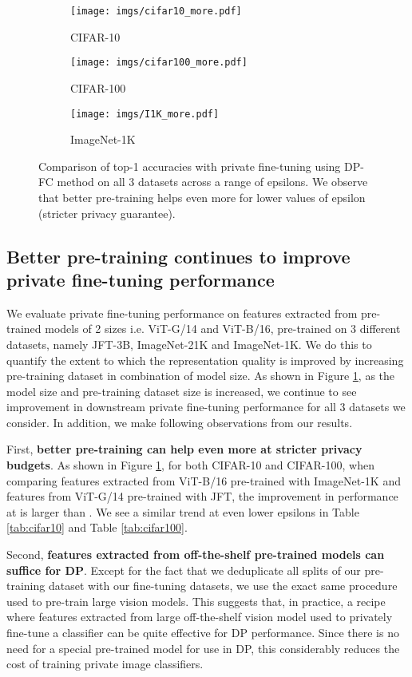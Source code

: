 \documentclass[letterpaper]{article} \usepackage{fullpage}
\begin{document}
\begin{figure}[h!]
  \centering
      \begin{subfigure}[b]{0.32\textwidth}
    \texttt{[image: imgs/cifar10\_more.pdf]}
    \caption{CIFAR-10}
  \end{subfigure}
    \begin{subfigure}[b]{0.32\textwidth}
    \texttt{[image: imgs/cifar100\_more.pdf]}
    \caption{CIFAR-100}
  \end{subfigure}
    \begin{subfigure}[b]{0.32\textwidth}
    \texttt{[image: imgs/I1K\_more.pdf]}
    \caption{ImageNet-1K}
    \end{subfigure}
  \caption{Comparison of top-1 accuracies with private fine-tuning using DP-FC method on all 3 datasets across a range of epsilons. We observe that better pre-training helps even more for lower values of epsilon (stricter privacy guarantee).}
  \label{fig:better_pretraining}
\end{figure}
\subsection{Better pre-training continues to improve private fine-tuning performance}
We evaluate private fine-tuning performance on features extracted from pre-trained models of 2 sizes i.e. ViT-G/14 and ViT-B/16, pre-trained on 3 different datasets, namely JFT-3B, ImageNet-21K and ImageNet-1K. We do this to quantify the extent to which the representation quality is improved by increasing pre-training dataset in combination of model size. As shown in Figure \ref{fig:better_pretraining}, as the model size and pre-training dataset size is increased, we continue to see improvement in downstream private fine-tuning performance for all 3 datasets we consider. In addition, we make following observations from our results.

First, \textbf{better pre-training can help even more at stricter privacy budgets}. As shown in Figure \ref{fig:better_pretraining}, for both CIFAR-10 and CIFAR-100, when comparing features extracted from ViT-B/16 pre-trained with ImageNet-1K and features from ViT-G/14 pre-trained with JFT, the improvement in performance at  is larger than . We see a similar trend at even lower epsilons in Table \ref{tab:cifar10} and Table \ref{tab:cifar100}.

Second, \textbf{features extracted from off-the-shelf pre-trained models can suffice for DP}. Except for the fact that we deduplicate all splits of our pre-training dataset with our fine-tuning datasets, we use the exact same procedure used to pre-train large vision models. This suggests that, in practice, a recipe where features extracted from large off-the-shelf vision model used to privately fine-tune a classifier can be quite effective for DP performance. Since there is no need for a special pre-trained model for use in DP, this considerably reduces the cost of training private image classifiers.
\end{document}
